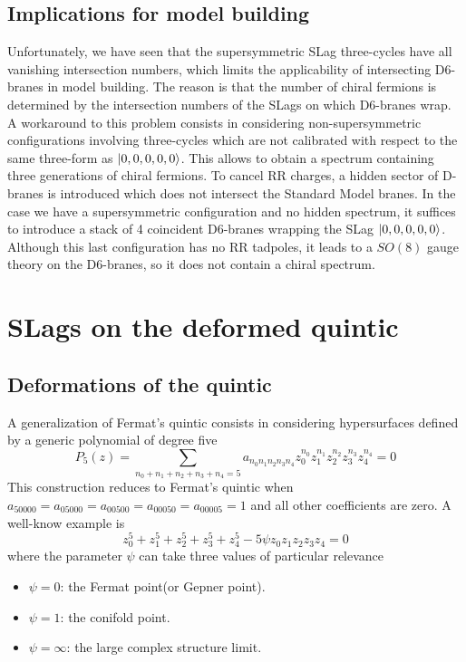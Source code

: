 \subsection{Implications for model building}
Unfortunately, we have seen that the supersymmetric SLag three-cycles have all vanishing 
intersection numbers, which limits the applicability of intersecting D$6$-branes in model building.
The reason is that the number of chiral fermions is determined by the intersection numbers 
of the SLags on which D$6$-branes wrap.
A workaround to this problem consists in considering non-supersymmetric configurations involving three-cycles
which are not calibrated with respect to the same three-form as $\ket{0,0,0,0,0}$.
This allows to obtain a spectrum containing three generations of chiral fermions.
To cancel RR charges, a hidden sector of D-branes is introduced which does not intersect the 
Standard Model branes.
In the case we have a supersymmetric configuration and no hidden spectrum, it suffices to introduce a stack of 4 coincident
D6-branes wrapping the SLag $\ket{0,0,0,0,0}$. Although this last configuration has no RR tadpoles, 
it leads to a $SO(8)$ gauge theory on the D6-branes, so it does not contain a chiral spectrum.

\section{SLags on the deformed quintic}

\subsection{Deformations of the quintic}

A generalization of Fermat's quintic consists in considering hypersurfaces defined by a generic polynomial of degree five
\begin{equation}
  P_5(z)=\sum_{n_0+n_1+n_2+n_3+n_4=5} a_{n_0 n_1 n_2 n_3 n_4} z_0^{n_0}z_1^{n_1}z_2^{n_2}z_3^{n_3}z_4^{n_4}=0
\end{equation}
This construction reduces to Fermat's quintic when $a_{50000}=a_{05000}=a_{00500}=a_{00050}=a_{00005}=1$ and all other coefficients are zero.
A well-know example is
\begin{equation}
  z_0^5+z_1^5+z_2^5+z_3^5+z_4^5- 5\psi z_0z_1z_2z_3z_4=0
\end{equation}
 where the parameter $\psi$ can take three values of particular relevance
\begin{itemize}
  \item $\psi=0$: the Fermat point(or Gepner point).
  \item $\psi=1$: the conifold point.
  \item $\psi=\infty$: the large complex structure limit.
\end{itemize}

